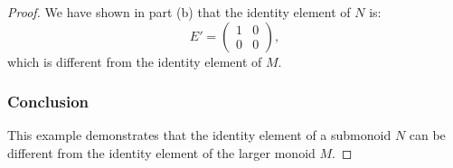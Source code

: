 \documentclass[12pt]{amsart}
\theoremstyle{definition}
\numberwithin{equation}{section}
\begin{document}
\begin{exercise}{2}
\begin{proof}
    We have shown in part (b) that the identity element of \(N\) is:
    \[
    E' = \begin{pmatrix}
    1 & 0 \\
    0 & 0
    \end{pmatrix},
    \]
    which is different from the identity element of \(M\).
    
    \subsubsection*{Conclusion}
    
    This example demonstrates that the identity element of a submonoid \(N\) can be different from the identity element of the larger monoid \(M\).
    
    \end{proof}
    \end{exercise}
    \newpage
    
\end{document}
